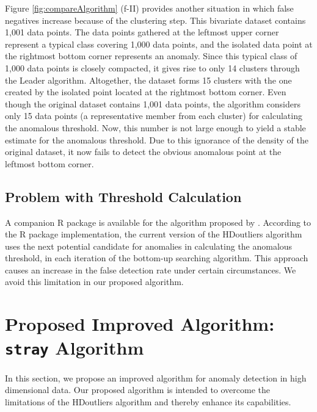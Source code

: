 \documentclass[11pt,a4paper,]{article}
\theoremstyle{definition}
\theoremstyle{definition}
\theoremstyle{definition}
\theoremstyle{remark}
\begin{document}
Figure \ref{fig:compareAlgorithm} (f-II) provides another situation in which false negatives increase because of the clustering step. This bivariate dataset contains 1,001 data points. The data points gathered at the leftmost upper corner represent a typical class covering 1,000 data points, and the isolated data point at the rightmost bottom corner represents an anomaly. Since this typical class of 1,000 data points is closely compacted, it gives rise to only 14 clusters through the Leader algorithm. Altogether, the dataset forms 15 clusters with the one created by the isolated point located at the rightmost bottom corner. Even though the original dataset contains 1,001 data points, the algorithm considers only 15 data points (a representative member from each cluster) for calculating the anomalous threshold. Now, this number is not large enough to yield a stable estimate for the anomalous threshold. Due to this ignorance of the density of the original dataset, it now fails to detect the obvious anomalous point at the leftmost bottom corner.

\hypertarget{problem-with-threshold-calculation}{%
\subsection{Problem with Threshold Calculation}\label{problem-with-threshold-calculation}}

A companion R package \autocite{HDoutliersR} is available for the algorithm proposed by \textcite{wilkinson2017visualizing}. According to the R package implementation, the current version of the HDoutliers algorithm uses the next potential candidate for anomalies in calculating the anomalous threshold, in each iteration of the bottom-up searching algorithm. This approach causes an increase in the false detection rate under certain circumstances. We avoid this limitation in our proposed algorithm.

\hypertarget{proposed-improved-algorithm-stray-algorithm}{%
\section{\texorpdfstring{Proposed Improved Algorithm: \texttt{stray} Algorithm}{Proposed Improved Algorithm: stray Algorithm}}\label{proposed-improved-algorithm-stray-algorithm}}

\label{sec:strayalgorithm}

In this section, we propose an improved algorithm for anomaly detection in high dimensional data. Our proposed algorithm is intended to overcome the limitations of the HDoutliers algorithm and thereby enhance its capabilities.
\end{document}
